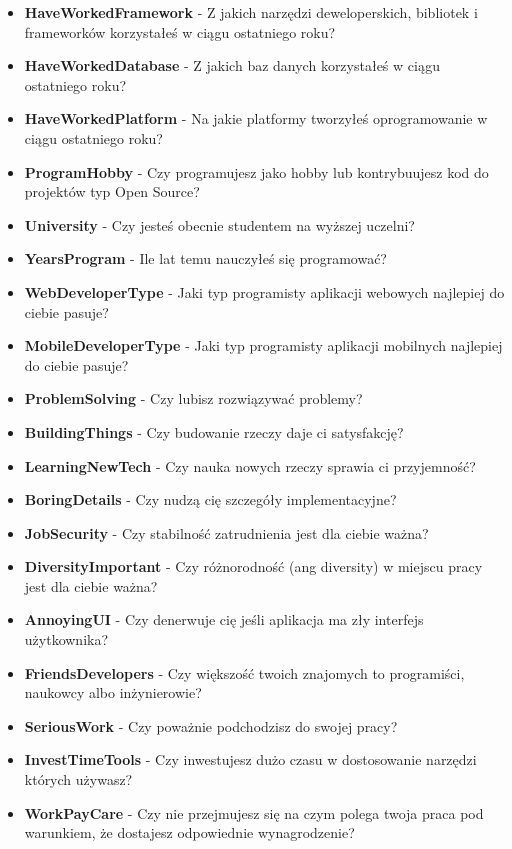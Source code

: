 \begin{appendices}
\begin{itemize}
        \item \textbf{HaveWorkedFramework} - Z jakich narzędzi deweloperskich, bibliotek i frameworków korzystałeś w ciągu ostatniego roku?
        \item \textbf{HaveWorkedDatabase} - Z jakich baz danych korzystałeś w ciągu ostatniego roku?
        \item \textbf{HaveWorkedPlatform} - Na jakie platformy tworzyłeś oprogramowanie w ciągu ostatniego roku?
        \item \textbf{ProgramHobby} - Czy programujesz jako hobby lub kontrybuujesz kod do projektów typ Open Source?
        \item \textbf{University} - Czy jesteś obecnie studentem na wyższej uczelni?
        \item \textbf{YearsProgram} - Ile lat temu nauczyłeś się programować?
        \item \textbf{WebDeveloperType} - Jaki typ programisty aplikacji webowych najlepiej do ciebie pasuje?
        \item \textbf{MobileDeveloperType} - Jaki typ programisty aplikacji mobilnych najlepiej do ciebie pasuje?
        \item \textbf{ProblemSolving} - Czy lubisz rozwiązywać problemy?
        \item \textbf{BuildingThings} - Czy budowanie rzeczy daje ci satysfakcję?
        \item \textbf{LearningNewTech} - Czy nauka nowych rzeczy sprawia ci przyjemność?
        \item \textbf{BoringDetails} - Czy nudzą cię szczegóły implementacyjne?
        \item \textbf{JobSecurity} - Czy stabilność zatrudnienia jest dla ciebie ważna?
        \item \textbf{DiversityImportant} - Czy różnorodność (ang diversity) w miejscu pracy jest dla ciebie ważna?
        \item \textbf{AnnoyingUI} - Czy denerwuje cię jeśli aplikacja ma zły interfejs użytkownika?
        \item \textbf{FriendsDevelopers} - Czy większość twoich znajomych to programiści, naukowcy albo inżynierowie?
        \item \textbf{SeriousWork} - Czy poważnie podchodzisz do swojej pracy?
        \item \textbf{InvestTimeTools} - Czy inwestujesz dużo czasu w dostosowanie narzędzi których używasz?
        \item \textbf{WorkPayCare} - Czy nie przejmujesz się na czym polega twoja praca pod warunkiem, że dostajesz odpowiednie wynagrodzenie?

\end{itemize}
\end{appendices}
